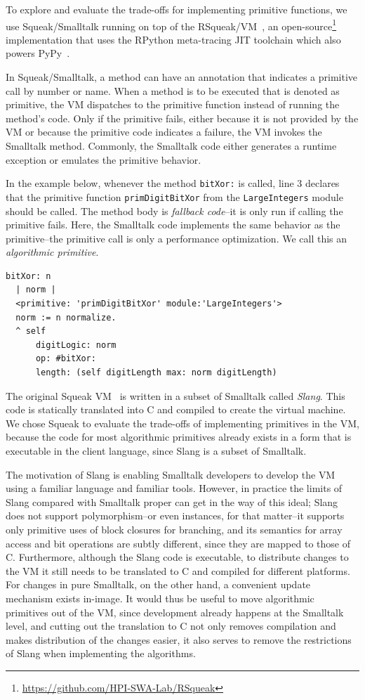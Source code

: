 \documentclass[
10pt,          %
]{sigplanconf}
\begin{document}
To explore and evaluate the trade-offs for implementing primitive
functions, we use Squeak/Smalltalk running on top of the
RSqueak/VM~\cite{BackToTheFutureInOneWeek}, an
open-source\footnote{\url{https://github.com/HPI-SWA-Lab/RSqueak}}
implementation that uses the RPython meta-tracing \ac{JIT} toolchain
which also powers PyPy~\cite{PyPy}.

In Squeak/Smalltalk, a method can have an annotation that indicates a primitive
call by number or name. When a method is to be executed that is denoted as
primitive, the \ac{VM} dispatches to the primitive function instead of running the
method's code. Only if the primitive fails, either because it is not provided
by the \ac{VM} or because the primitive code indicates a failure, the \ac{VM} invokes the
Smalltalk method. Commonly, the Smalltalk code either generates a runtime exception or
emulates the primitive behavior.

In the example below, whenever the method \verb!bitXor:! is called, line 3
declares that the primitive function \verb!primDigitBitXor! from the
\verb!LargeIntegers! module should be called. The method body is \emph{fallback
  code}\---it is only run if calling the primitive fails. Here, the Smalltalk
code implements the same behavior as the primitive\---the primitive call is
only a performance optimization. We call this an \emph{algorithmic primitive}.
\begin{lstlisting}
bitXor: n
  | norm |
  <primitive: 'primDigitBitXor' module:'LargeIntegers'>
  norm := n normalize.
  ^ self
      digitLogic: norm
      op: #bitXor:
      length: (self digitLength max: norm digitLength)
\end{lstlisting}

The original Squeak \ac{VM}~\cite{BackToTheFuture} is written in a subset of
Smalltalk called \emph{Slang}. This code is statically translated into C and
compiled to create the virtual machine. We chose Squeak to evaluate the
trade-offs of implementing primitives in the \ac{VM}, because the code for most
algorithmic primitives already exists in a form that is executable in the client
language, since Slang is a subset of Smalltalk.

The motivation of Slang is enabling Smalltalk developers to develop the \ac{VM}
using a familiar language and familiar tools. However, in practice the limits
of Slang compared with Smalltalk proper can get in the way of this ideal; Slang
does not support polymorphism\---or even instances, for that matter\---it
supports only primitive uses of block closures for branching, and its semantics
for array access and bit operations are subtly different, since they are mapped
to those of C. Furthermore, although the Slang code is executable, to
distribute changes to the \ac{VM} it still needs to be translated to C and compiled
for different platforms. For changes in pure Smalltalk, on the other hand, a
convenient update mechanism exists in-image. It would thus be useful to move
algorithmic primitives out of the \ac{VM}, since development already happens at the
Smalltalk level, and cutting out the translation to C not only removes
compilation and makes distribution of the changes easier, it also serves to
remove the restrictions of Slang when implementing the algorithms.
\end{document}
